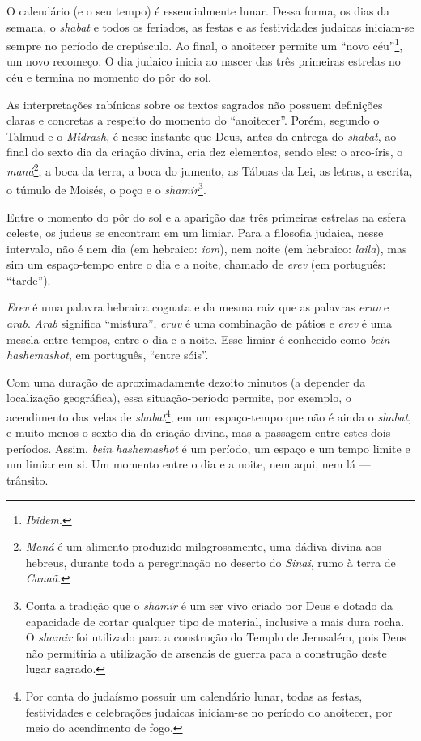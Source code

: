 O calendário (e o seu tempo) é essencialmente lunar. Dessa forma, os
dias da semana, o \emph{shabat} e todos os feriados, as festas e as
festividades judaicas iniciam-se sempre no período de crepúsculo. Ao
final, o anoitecer permite um ``novo céu''\footnote{\emph{Ibidem}.}, um
novo recomeço. O dia judaico inicia ao nascer das três primeiras
estrelas no céu e termina no momento do pôr do sol.

As interpretações rabínicas sobre os textos sagrados não possuem
definições claras e concretas a respeito do momento do ``anoitecer''.
Porém, segundo o Talmud e o \emph{Midrash}, é nesse instante que
Deus, antes da entrega do \emph{shabat}, ao final do sexto dia da
criação divina, cria dez elementos, sendo eles: o arco-íris, o
\emph{maná}\footnote{\emph{Maná} é um alimento produzido milagrosamente,
  uma dádiva divina aos hebreus, durante toda a peregrinação no deserto
  do \emph{Sinai}, rumo à terra de \emph{Canaã}.}, a boca da terra, a
boca do jumento, as Tábuas da Lei, as letras, a escrita, o túmulo de
Moisés, o poço e o \emph{shamir}\footnote{Conta a tradição que o
  \emph{shamir} é um ser vivo criado por Deus e dotado da capacidade de
  cortar qualquer tipo de material, inclusive a mais dura rocha. O
  \emph{shamir} foi utilizado para a construção do Templo de Jerusalém,
  pois Deus não permitiria a utilização de arsenais de guerra para a
  construção deste lugar sagrado.}.

Entre o momento do pôr do sol e a aparição das três primeiras estrelas
na esfera celeste, os judeus se encontram em um limiar. Para a filosofia
judaica, nesse intervalo, não é nem dia
(em hebraico: \emph{iom}), nem noite (em hebraico: \emph{laila}), mas
sim um espaço-tempo entre o dia e a noite, chamado de \emph{erev} (em
português: ``tarde'').

\emph{Erev} é uma palavra hebraica cognata e da mesma raiz que as
palavras \emph{eruv} e \emph{arab}. \emph{Arab} significa ``mistura'',
\emph{eruv} é uma combinação de pátios e \emph{erev} é uma mescla entre
tempos, entre o dia e a noite. Esse limiar é conhecido como \emph{bein
hashemashot}, em português, ``entre sóis''.

Com uma duração de aproximadamente dezoito minutos (a depender da
localização geográfica), essa situação-período permite, por exemplo, o
acendimento das velas de \emph{shabat}\footnote{Por conta do judaísmo
  possuir um calendário lunar, todas as festas, festividades e
  celebrações judaicas iniciam-se no período do anoitecer, por meio do
  acendimento de fogo.}, em um espaço-tempo que não é ainda o
\emph{shabat}, e muito menos o sexto dia da criação divina, mas a
passagem entre estes dois períodos. Assim, \emph{bein hashemashot} é um
período, um espaço e um tempo limite e um limiar em si. Um momento entre
o dia e a noite, nem aqui, nem lá --- trânsito.

